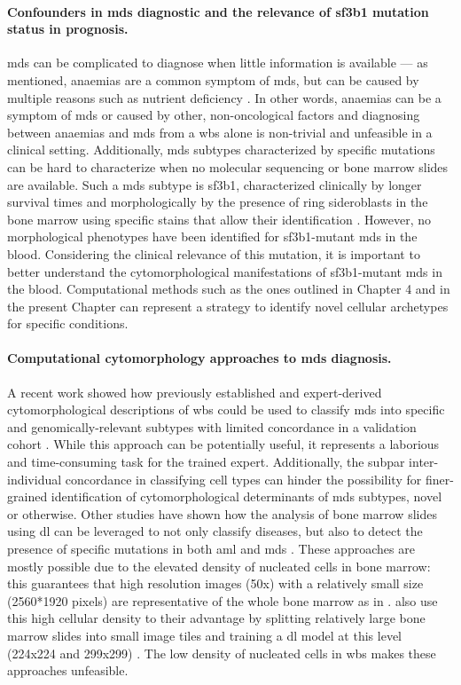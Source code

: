 \paragraph{Confounders in \ac{mds} diagnostic and the relevance of \ac{sf3b1} mutation status in prognosis.} \Ac{mds} can be complicated to diagnose when little information is available --- as mentioned, anaemias are a common symptom of \ac{mds}, but can be caused by multiple reasons such as nutrient deficiency \cite{Castle1978-ky,Short2013-pz,Aslinia2006-en}. In other words, anaemias can be a symptom of \ac{mds} or caused by other, non-oncological factors and diagnosing between anaemias and \ac{mds} from a \ac{wbs} alone is non-trivial and unfeasible in a clinical setting. Additionally, \ac{mds} subtypes characterized by specific mutations can be hard to characterize when no molecular sequencing or bone marrow slides are available. Such a \ac{mds} subtype is \ac{sf3b1}, characterized clinically by longer survival times \cite{Malcovati2020-no} and morphologically by the presence of ring sideroblasts in the bone marrow using specific stains that allow their identification \cite{Hellstrom_Lindberg2015-zs}. However, no morphological phenotypes have been identified for \ac{sf3b1}-mutant \ac{mds} in the blood. Considering the clinical relevance of this mutation, it is important to better understand the cytomorphological manifestations of \ac{sf3b1}-mutant \ac{mds} in the blood. Computational methods such as the ones outlined in Chapter 4 and in the present Chapter can represent a strategy to identify novel cellular archetypes for specific conditions.

\paragraph{Computational cytomorphology approaches to \ac{mds} diagnosis.} A recent work showed how previously established and expert-derived cytomorphological descriptions of \ac{wbs} could be used to classify \ac{mds} into specific and genomically-relevant subtypes with limited concordance in a validation cohort \cite{Nagata2020-lh}. While this approach can be potentially useful, it represents a laborious and time-consuming task for the trained expert. Additionally, the subpar inter-individual concordance in classifying cell types can hinder the possibility for finer-grained identification of cytomorphological determinants of \ac{mds} subtypes, novel or otherwise. Other studies have shown how the analysis of bone marrow slides using \ac{dl} can be leveraged to not only classify diseases, but also to detect the presence of specific mutations in both \ac{aml} and \ac{mds} \cite{Bruck2021-fx,Eckardt2021-fb}. These approaches are mostly possible due to the elevated density of nucleated cells in bone marrow: this guarantees that high resolution images (50x) with a relatively small size (2560*1920 pixels) are representative of the whole bone marrow as in \cite{Eckardt2021-fb}.   also use this high cellular density to their advantage by splitting relatively large bone marrow slides into small image tiles and training a \ac{dl} model at this level (224x224 and 299x299) \cite{Bruck2021-fx}. The low density of nucleated cells in \ac{wbs} makes these approaches unfeasible.

